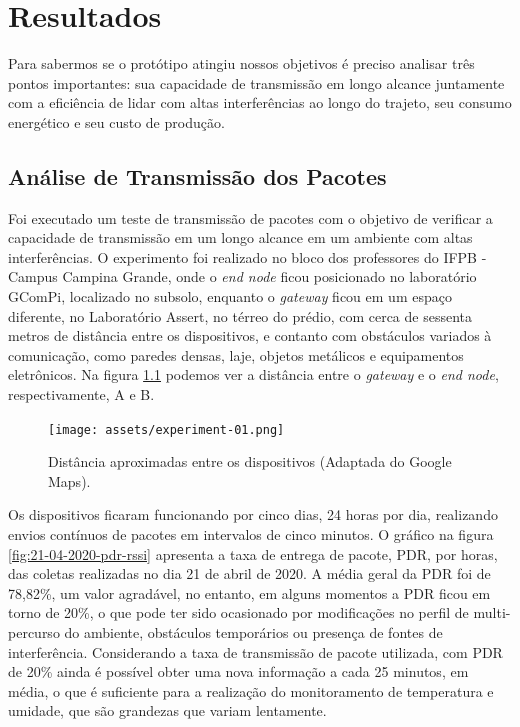 \chapter{Resultados}
\label{cap:result}
Para sabermos se o protótipo atingiu nossos objetivos é preciso analisar três pontos importantes: sua capacidade de transmissão em longo alcance juntamente com a eficiência de lidar com altas interferências ao longo do trajeto, seu consumo energético e seu custo de produção.

\section{Análise de Transmissão dos Pacotes}
\label{result:transmissao}
Foi executado um teste de transmissão de pacotes com o objetivo de verificar a capacidade de transmissão em um longo alcance em um ambiente com altas interferências. O experimento foi realizado no bloco dos professores do IFPB - Campus Campina Grande, onde o \textit{end node} ficou posicionado no laboratório GComPi, localizado no subsolo, enquanto o \textit{gateway} ficou em um espaço diferente, no Laboratório Assert, no térreo do prédio, com cerca de sessenta metros de distância entre os dispositivos, e contanto com obstáculos variados à comunicação, como paredes densas, laje, objetos metálicos e equipamentos eletrônicos. Na figura \ref{fig:experiment-01} podemos ver a distância entre o \textit{gateway} e o \textit{end node}, respectivamente, A e B.

\begin{figure}[H]
  \centering
  \texttt{[image: assets/experiment-01.png]} 
  \caption{Distância aproximadas entre os dispositivos (Adaptada do Google Maps).}
  \label{fig:experiment-01} 
\end{figure}

Os dispositivos ficaram funcionando por cinco dias, 24 horas por dia, realizando envios contínuos de pacotes em intervalos de cinco minutos. O gráfico na figura \ref{fig:21-04-2020-pdr-rssi} apresenta a taxa de entrega de pacote, PDR, por horas, das coletas realizadas no dia 21 de abril de 2020. A média geral da PDR foi de 78,82\%, um valor agradável, no entanto, em alguns momentos a PDR ficou em torno de 20\%, o que pode ter sido ocasionado por modificações no perfil de multi-percurso do ambiente, obstáculos temporários ou presença de fontes de interferência. Considerando a taxa de transmissão de pacote utilizada, com PDR de 20\% ainda é possível obter uma nova informação a cada 25 minutos, em média, o que é suficiente para a realização do monitoramento de temperatura e umidade, que são grandezas que variam lentamente.

